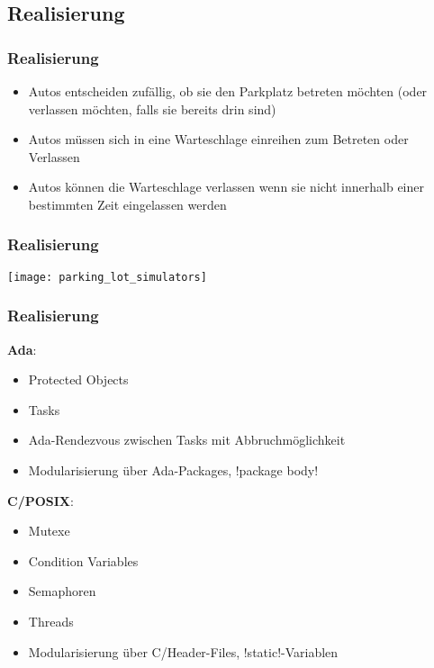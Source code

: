 \documentclass[ngerman]{presentation}
\begin{document}
\subsection{Realisierung}
\label{sec:realisierung}

\begin{frame}[c,label=realisierung]
    \frametitle{Realisierung}

    \begin{itemize}
        \item Autos entscheiden zufällig, ob sie den Parkplatz betreten möchten
            (oder verlassen möchten, falls sie bereits drin sind)
        \item Autos müssen sich in eine Warteschlage einreihen zum Betreten oder
            Verlassen
        \item Autos können die Warteschlage verlassen wenn sie nicht innerhalb
            einer bestimmten Zeit eingelassen werden
    \end{itemize}
\end{frame}

\begin{frame}[c,label=realisierung]
    \frametitle{Realisierung}

    \vspace{-0.6cm}\hspace*{-0.9cm}\texttt{[image: parking\_lot\_simulators]}
\end{frame}

\begin{frame}[c,label=realisierung]
    \frametitle{Realisierung}

    \textbf{Ada}:
    \begin{itemize}
        \item Protected Objects
        \item Tasks
        \item Ada-Rendezvous zwischen Tasks mit Abbruchmöglichkeit
        \item Modularisierung über Ada-Packages, \adainline!package body!
    \end{itemize}

    \pause

    \textbf{C/POSIX}:
    \begin{itemize}
        \item Mutexe
        \item Condition Variables
        \item Semaphoren
        \item Threads
        \item Modularisierung über C/Header-Files, \cinline!static!-Variablen
    \end{itemize}
\end{frame}
\end{document}
